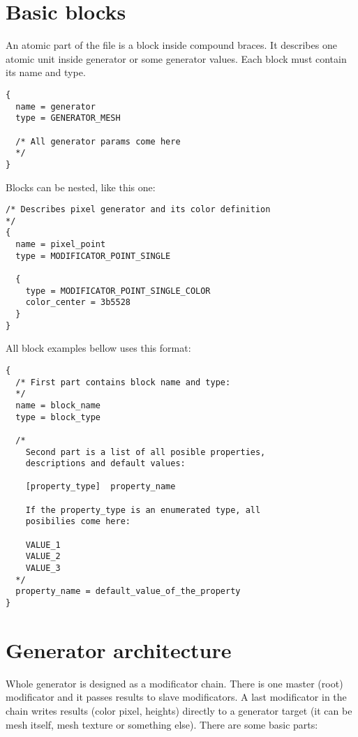 \documentclass[9pt]{article}
\begin{document}
\section{Basic blocks}
An atomic part of the file is a block inside compound braces. It describes one 
atomic unit inside generator or some generator values. Each block must
contain its name and type.
\begin{verbatim}
{
  name = generator
  type = GENERATOR_MESH

  /* All generator params come here
  */
}
\end{verbatim}
Blocks can be nested, like this one:
\begin{verbatim}
/* Describes pixel generator and its color definition
*/
{
  name = pixel_point
  type = MODIFICATOR_POINT_SINGLE

  {
    type = MODIFICATOR_POINT_SINGLE_COLOR
    color_center = 3b5528
  }
}
\end{verbatim}
All block examples bellow uses this format:
\begin{verbatim}
{
  /* First part contains block name and type:
  */
  name = block_name
  type = block_type

  /*
    Second part is a list of all posible properties,
    descriptions and default values:

    [property_type]  property_name
   
    If the property_type is an enumerated type, all 
    posibilies come here:
    
    VALUE_1
    VALUE_2
    VALUE_3
  */  
  property_name = default_value_of_the_property  
}
\end{verbatim}

\section{Generator architecture}
Whole generator is designed as a modificator chain. There is one master (root)
modificator and it passes results to slave modificators. A last modificator 
in the chain writes results (color pixel, heights) directly to a generator target
(it can be mesh itself, mesh texture or something else). There are some basic parts:
\end{document}

